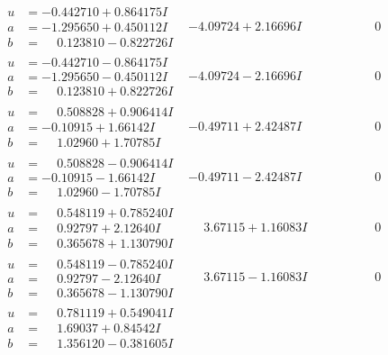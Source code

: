 \documentclass[1p]{elsarticle_modified}
\theoremstyle{definition}
\begin{document}
$$\begin{array}{c|c|c}
\begin{aligned}
u &= -0.442710 + 0.864175 I \\
a &= -1.295650 + 0.450112 I \\
b &= \phantom{-}0.123810 - 0.822726 I\end{aligned}
 & -4.09724 + 2.16696 I & \phantom{-0.000000 } 0 \\ \hline\begin{aligned}
u &= -0.442710 - 0.864175 I \\
a &= -1.295650 - 0.450112 I \\
b &= \phantom{-}0.123810 + 0.822726 I\end{aligned}
 & -4.09724 - 2.16696 I & \phantom{-0.000000 } 0 \\ \hline\begin{aligned}
u &= \phantom{-}0.508828 + 0.906414 I \\
a &= -0.10915 + 1.66142 I \\
b &= \phantom{-}1.02960 + 1.70785 I\end{aligned}
 & -0.49711 + 2.42487 I & \phantom{-0.000000 } 0 \\ \hline\begin{aligned}
u &= \phantom{-}0.508828 - 0.906414 I \\
a &= -0.10915 - 1.66142 I \\
b &= \phantom{-}1.02960 - 1.70785 I\end{aligned}
 & -0.49711 - 2.42487 I & \phantom{-0.000000 } 0 \\ \hline\begin{aligned}
u &= \phantom{-}0.548119 + 0.785240 I \\
a &= \phantom{-}0.92797 + 2.12640 I \\
b &= \phantom{-}0.365678 + 1.130790 I\end{aligned}
 & \phantom{-}3.67115 + 1.16083 I & \phantom{-0.000000 } 0 \\ \hline\begin{aligned}
u &= \phantom{-}0.548119 - 0.785240 I \\
a &= \phantom{-}0.92797 - 2.12640 I \\
b &= \phantom{-}0.365678 - 1.130790 I\end{aligned}
 & \phantom{-}3.67115 - 1.16083 I & \phantom{-0.000000 } 0 \\ \hline\begin{aligned}
u &= \phantom{-}0.781119 + 0.549041 I \\
a &= \phantom{-}1.69037 + 0.84542 I \\
b &= \phantom{-}1.356120 - 0.381605 I\end{aligned}

\end{array}$$
\end{document}
